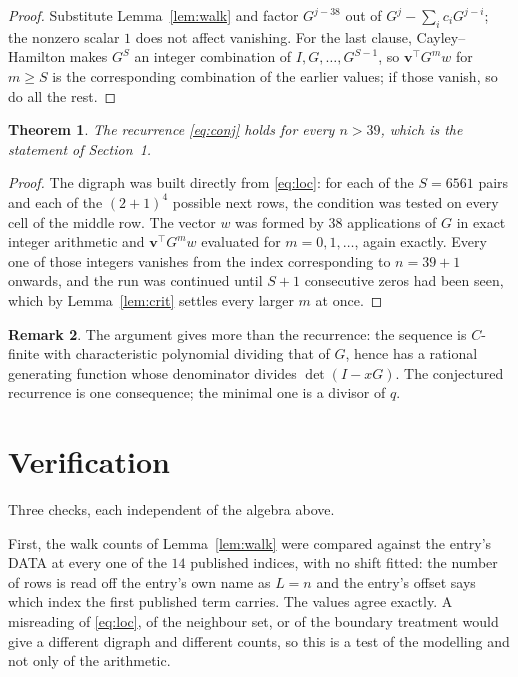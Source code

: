 \documentclass[11pt,a4paper]{article}
\theoremstyle{plain}
\newtheorem{theorem}{Theorem}
\theoremstyle{definition}
\newtheorem{remark}[theorem]{Remark}
\begin{document}
\begin{proof}
Substitute Lemma~\ref{lem:walk} and factor $G^{j-38}$ out of
$G^{j}-\sum_ic_iG^{j-i}$; the nonzero scalar $1$ does not affect
vanishing. For the last clause, Cayley--Hamilton makes $G^{S}$ an integer combination of
$I,G,\dots,G^{S-1}$, so $\mathbf{v}^{\!\top}G^{m}w$ for $m\ge S$ is the corresponding
combination of the earlier values; if those vanish, so do all the rest.
\end{proof}

\begin{theorem}
The recurrence \eqref{eq:conj} holds for every $n>39$, which is the statement of
Section~1.
\end{theorem}

\begin{proof}
The digraph was built directly from \eqref{eq:loc}: for each of the $S=6561$ pairs and each
of the $(2+1)^{4}$ possible next rows, the condition was tested on every cell of
the middle row. The vector $w$ was formed by $38$ applications of $G$ in exact integer
arithmetic and $\mathbf{v}^{\!\top}G^{m}w$ evaluated for $m=0,1,\dots$, again exactly.
Every one of those integers vanishes from the index corresponding to $n=39+1$ onwards,
and the run was continued until $S+1$ consecutive zeros had been seen, which by
Lemma~\ref{lem:crit} settles every larger $m$ at once.
\end{proof}

\begin{remark}
The argument gives more than the recurrence: the sequence is $C$-finite with characteristic
polynomial dividing that of $G$, hence has a rational generating function whose denominator
divides $\det(I-xG)$. The conjectured recurrence is one consequence; the minimal one is a
divisor of $q$.
\end{remark}

\section{Verification}

Three checks, each independent of the algebra above.

First, the walk counts of Lemma~\ref{lem:walk} were compared against the entry's DATA at
every one of the $14$ published indices, with no shift fitted: the number of rows is
read off the entry's own name as $L=n$ and the entry's offset says which index the first
published term carries. The values agree exactly. A misreading of \eqref{eq:loc}, of the
neighbour set, or of the boundary treatment would give a different digraph and different
counts, so this is a test of the modelling and not only of the arithmetic.
\end{document}
